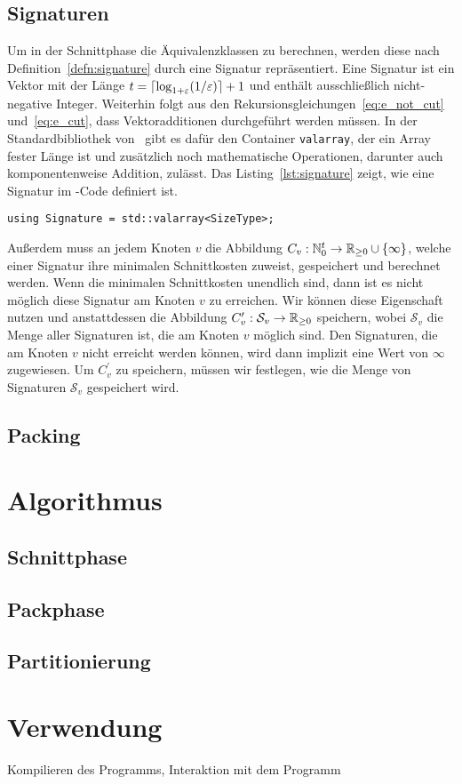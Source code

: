 \subsection{Signaturen}
Um in der Schnittphase die Äquivalenzklassen zu berechnen, werden diese nach Definition~\ref{defn:signature} durch eine Signatur repräsentiert.
Eine Signatur ist ein Vektor mit der Länge $t = \lceil\log_{1+\varepsilon}(1/\varepsilon)\rceil + 1$ und enthält ausschließlich nicht-negative Integer.
Weiterhin folgt aus den Rekursionsgleichungen~\eqref{eq:e_not_cut} und~\eqref{eq:e_cut}, dass Vektoradditionen durchgeführt werden müssen.
In der Standardbibliothek von \Cpp\ gibt es dafür den Container \texttt{valarray}, der ein Array fester Länge ist und zusätzlich noch mathematische Operationen, darunter auch komponentenweise Addition, zulässt. 
Das Listing~\ref{lst:signature} zeigt, wie eine Signatur im \Cpp\hyp Code definiert ist.
\begin{lstlisting}[caption={Definition von \texttt{Signature}}, label={lst:signature}]
using Signature = std::valarray<SizeType>;
\end{lstlisting}

Außerdem muss an jedem Knoten $v$ die Abbildung $C_v : \mathbb{N}^t_0 \rightarrow \mathbb{R}_{\geq 0} \cup \{\infty\}$, welche einer Signatur ihre minimalen Schnittkosten zuweist, gespeichert und berechnet werden.
Wenn die minimalen Schnittkosten unendlich sind, dann ist es nicht möglich diese Signatur am Knoten $v$ zu erreichen.
Wir können diese Eigenschaft nutzen und anstattdessen die Abbildung $C_v^\prime : \mathcal{S}_v \rightarrow \mathbb{R}_{\geq 0}$ speichern, wobei $\mathcal{S}_v$ die Menge aller Signaturen ist, die am Knoten $v$ möglich sind.
Den Signaturen, die am Knoten $v$ nicht erreicht werden können, wird dann implizit eine Wert von $\infty$ zugewiesen.
Um $C^\prime_v$ zu speichern, müssen wir festlegen, wie die Menge von Signaturen $\mathcal{S}_v$ gespeichert wird.



\subsection{Packing}

\section{Algorithmus}
\subsection{Schnittphase}
\subsection{Packphase}
\subsection{Partitionierung}
\section{Verwendung}
Kompilieren des Programms, Interaktion mit dem Programm
